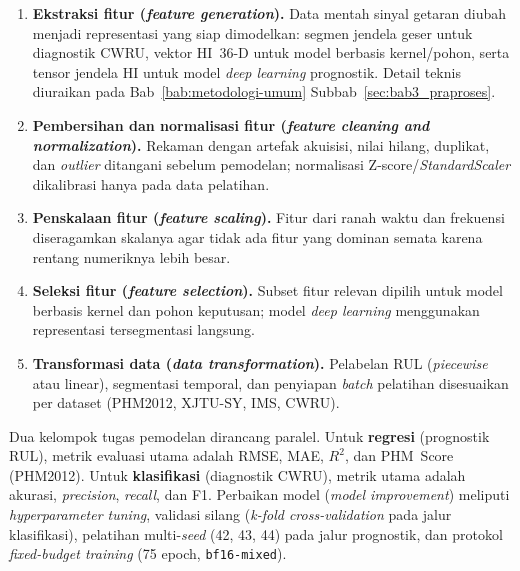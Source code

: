 {\color{blue}
\begin{enumerate}
  \item \textbf{Ekstraksi fitur (\emph{feature generation}).}
        Data mentah sinyal getaran diubah menjadi representasi yang siap
        dimodelkan: segmen jendela geser untuk diagnostik CWRU, vektor
        HI~36-D untuk model berbasis kernel/pohon, serta tensor jendela
        HI untuk model \emph{deep learning} prognostik.
        Detail teknis diuraikan pada Bab~\ref{bab:metodologi-umum}
        Subbab~\ref{sec:bab3_praproses}.
  \item \textbf{Pembersihan dan normalisasi fitur (\emph{feature cleaning
        and normalization}).}
        Rekaman dengan artefak akuisisi, nilai hilang, duplikat, dan
        \emph{outlier} ditangani sebelum pemodelan; normalisasi
        Z-score/\emph{StandardScaler} dikalibrasi hanya pada data
        pelatihan.
  \item \textbf{Penskalaan fitur (\emph{feature scaling}).}
        Fitur dari ranah waktu dan frekuensi diseragamkan skalanya agar
        tidak ada fitur yang dominan semata karena rentang numeriknya
        lebih besar.
  \item \textbf{Seleksi fitur (\emph{feature selection}).}
        Subset fitur relevan dipilih untuk model berbasis kernel dan
        pohon keputusan; model \emph{deep learning} menggunakan
        representasi tersegmentasi langsung.
  \item \textbf{Transformasi data (\emph{data transformation}).}
        Pelabelan RUL (\emph{piecewise} atau linear), segmentasi temporal,
        dan penyiapan \emph{batch} pelatihan disesuaikan per dataset
        (PHM2012, XJTU-SY, IMS, CWRU).
\end{enumerate}
}

{\color{blue}
Dua kelompok tugas pemodelan dirancang paralel.
Untuk \textbf{regresi} (prognostik RUL), metrik evaluasi utama adalah
RMSE, MAE, $R^2$, dan PHM~Score (PHM2012).
Untuk \textbf{klasifikasi} (diagnostik CWRU), metrik utama adalah akurasi,
\emph{precision}, \emph{recall}, dan F1.
Perbaikan model (\emph{model improvement}) meliputi \emph{hyperparameter
tuning}, validasi silang (\emph{k-fold cross-validation} pada jalur
klasifikasi), pelatihan multi-\emph{seed} (42, 43, 44) pada jalur
prognostik, dan protokol \emph{fixed-budget training} (75 epoch,
\texttt{bf16-mixed}).
}

